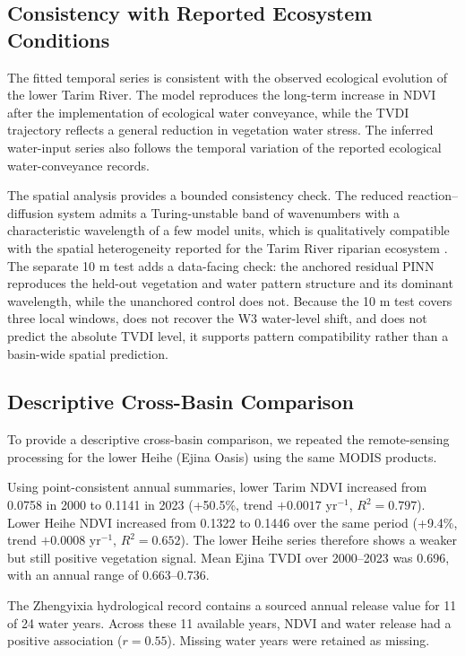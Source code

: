 \documentclass[preprint,review,12pt,3p]{elsarticle}
\begin{document}
	\subsection{Consistency with Reported Ecosystem Conditions}

	The fitted temporal series is consistent with the observed ecological evolution of the lower Tarim River. The model reproduces the long-term increase in NDVI after the implementation of ecological water conveyance, while the TVDI trajectory reflects a general reduction in vegetation water stress. The inferred water-input series also follows the temporal variation of the reported ecological water-conveyance records.

	The spatial analysis provides a bounded consistency check. The reduced reaction--diffusion system admits a Turing-unstable band of wavenumbers with a characteristic wavelength of a few model units, which is qualitatively compatible with the spatial heterogeneity reported for the Tarim River riparian ecosystem \citep{ma2025response}. The separate 10 m test adds a data-facing check: the anchored residual PINN reproduces the held-out vegetation and water pattern structure and its dominant wavelength, while the unanchored control does not. Because the 10 m test covers three local windows, does not recover the W3 water-level shift, and does not predict the absolute TVDI level, it supports pattern compatibility rather than a basin-wide spatial prediction.
	\subsection{Descriptive Cross-Basin Comparison}
	\label{subsec:cross_basin}

	To provide a descriptive cross-basin comparison, we repeated the remote-sensing processing for the lower Heihe (Ejina Oasis) using the same MODIS products.

	Using point-consistent annual summaries, lower Tarim NDVI increased from 0.0758 in 2000 to 0.1141 in 2023 (+50.5\%, trend $+0.0017$ yr$^{-1}$, $R^2=0.797$). Lower Heihe NDVI increased from 0.1322 to 0.1446 over the same period (+9.4\%, trend $+0.0008$ yr$^{-1}$, $R^2=0.652$). The lower Heihe series therefore shows a weaker but still positive vegetation signal. Mean Ejina TVDI over 2000--2023 was 0.696, with an annual range of 0.663--0.736.

	The Zhengyixia hydrological record contains a sourced annual release value for 11 of 24 water years. Across these 11 available years, NDVI and water release had a positive association ($r=0.55$). Missing water years were retained as missing.
\end{document}
